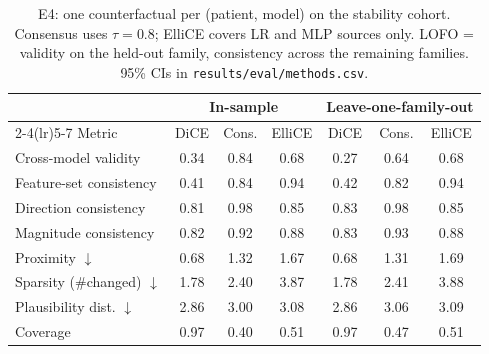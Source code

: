 \begin{table}[t]
\centering
\caption{E4: one counterfactual per (patient, model) on the stability cohort. Consensus uses $\tau=0.8$; ElliCE covers LR and MLP sources only. LOFO = validity on the held-out family, consistency across the remaining families. 95\% CIs in \texttt{results/eval/methods.csv}.}
\label{tab:methods}
\footnotesize
\setlength{\tabcolsep}{3pt}
\begin{tabular}{lcccccc}
\toprule
& \multicolumn{3}{c}{In-sample} & \multicolumn{3}{c}{Leave-one-family-out} \\
\cmidrule(lr){2-4}\cmidrule(lr){5-7}
Metric & DiCE & Cons. & ElliCE & DiCE & Cons. & ElliCE \\
\midrule
Cross-model validity & 0.34 & 0.84 & 0.68 & 0.27 & 0.64 & 0.68 \\
Feature-set consistency & 0.41 & 0.84 & 0.94 & 0.42 & 0.82 & 0.94 \\
Direction consistency & 0.81 & 0.98 & 0.85 & 0.83 & 0.98 & 0.85 \\
Magnitude consistency & 0.82 & 0.92 & 0.88 & 0.83 & 0.93 & 0.88 \\
Proximity $\downarrow$ & 0.68 & 1.32 & 1.67 & 0.68 & 1.31 & 1.69 \\
Sparsity (\#changed) $\downarrow$ & 1.78 & 2.40 & 3.87 & 1.78 & 2.41 & 3.88 \\
Plausibility dist. $\downarrow$ & 2.86 & 3.00 & 3.08 & 2.86 & 3.06 & 3.09 \\
Coverage & 0.97 & 0.40 & 0.51 & 0.97 & 0.47 & 0.51 \\
\bottomrule
\end{tabular}
\end{table}
